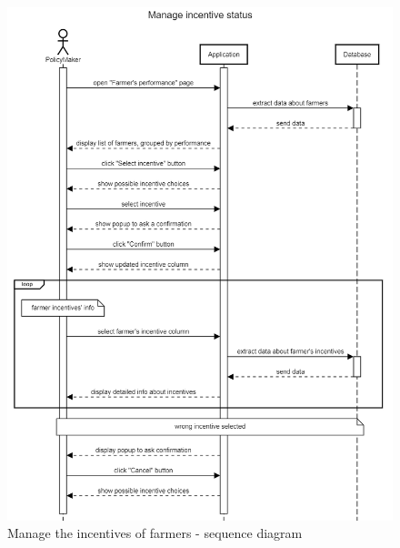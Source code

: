 \begin{figure}[H]
    \centering
    \includegraphics[scale=0.5]{Images/Sequence diagrams/SE2 - manage incentive status (pm).png}
    \caption{Manage the incentives of farmers - sequence diagram}
    \label{fig:seq_diag_visualize_incentive}
\end{figure}

